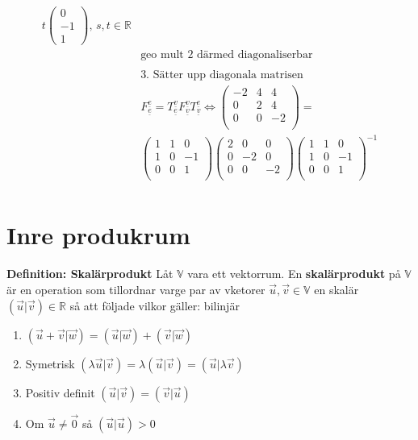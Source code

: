 \begin{multicols}{2}
\begin{align*}
  t\begin{pmatrix} 0 \\ -1 \\ 1 \end{pmatrix}, \, s,t\in\mathbb{R} \\
  &\text{geo mult 2 därmed diagonaliserbar } \\
  &\\
  &\text{3. Sätter upp diagonala matrisen} \\
  &{F}^{\underline{e}}_{\underline{e}} =
  {T}^{\underline{v}}_{\underline{e}} {F}^{\underline{v}}_{\underline{v}} {T}^{\underline{e}}_{\underline{v}}
  \Leftrightarrow{} 
  \left(\begin{array}{ccc}
   -2 & 4 & 4  \\
    0 & 2 & 4  \\
    0 & 0 & -2 \\
  \end{array}\right) = \\
  &\left(\begin{array}{ccc}
    1 & 1 &  0  \\
    1 & 0 & -1  \\
    0 & 0 &  1  \\
  \end{array}\right)
  \left(\begin{array}{ccc}
    2 &  0 &  0  \\
    0 & -2 &  0  \\
    0 &  0 & -2 \\
  \end{array}\right)
  \left(\begin{array}{ccc}
    1 & 1 &  0 \\
    1 & 0 & -1 \\
    0 & 0 &  1 \\
  \end{array}\right)^{-1} \\
\end{align*}


\section{Inre produkrum}
\textbf{Definition: Skalärprodukt}
Låt $\mathbb{V}$ vara ett vektorrum. En \textbf{skalärprodukt} på $\mathbb{V}$ är
en operation som tillordnar varge par av vketorer $\vec{u},\vec{v}\in\mathbb{V}$ en skalär
$(\vec{u}|\vec{v})\in\mathbb{R}$ så att följade vilkor gäller:
bilinjär
\begin{enumerate}
  \item $(\vec{u} + \vec{v}|\vec{w}) = (\vec{u}|\vec{w}) + (\vec{v}|\vec{w})$
  \item Symetrisk $(\lambda\vec{u}|\vec{v}) = \lambda(\vec{u}|\vec{v}) = (\vec{u}|\lambda\vec{v})$
  \item Positiv definit $(\vec{u}|\vec{v}) = (\vec{v}|\vec{u})$
  \item Om $\vec{u}\neq\vec{0}$ så $(\vec{u}|\vec{u}) > 0$
\end{enumerate}


\end{multicols}
